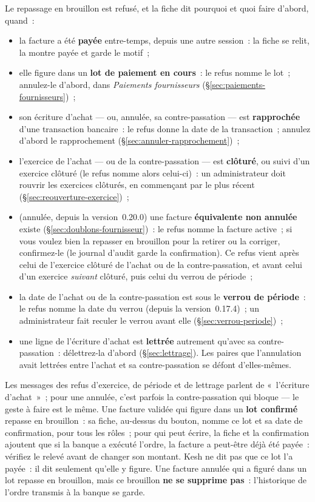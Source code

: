 \documentclass[a4paper,11pt,oneside]{article}
\begin{document}
Le repassage en brouillon est refusé, et la fiche dit pourquoi et quoi faire d'abord, quand~:
\begin{itemize}
    \item la facture a été \textbf{payée} entre-temps, depuis une autre session~: la fiche se
          relit, la montre payée et garde le motif~;
    \item elle figure dans un \textbf{lot de paiement en cours}~: le refus nomme le lot~;
          annulez-le d'abord, dans \emph{Paiements fournisseurs}
          (\S\ref{sec:paiements-fournisseurs})~;
    \item son écriture d'achat --- ou, annulée, sa contre-passation --- est \textbf{rapprochée}
          d'une transaction bancaire~: le refus donne la date de la transaction~; annulez
          d'abord le rapprochement (\S\ref{sec:annuler-rapprochement})~;
    \item l'exercice de l'achat --- ou de la contre-passation --- est \textbf{clôturé}, ou suivi
          d'un exercice clôturé (le refus nomme alors celui-ci)~: un administrateur doit rouvrir
          les exercices clôturés, en commençant par le plus récent
          (\S\ref{sec:reouverture-exercice})~;
    \item (annulée, depuis la version~0.20.0) une facture \textbf{équivalente non annulée}
          existe (\S\ref{sec:doublons-fournisseur})~: le refus nomme la facture active~; si
          vous voulez bien la repasser en brouillon pour la retirer ou la corriger, confirmez-le
          (le journal d'audit garde la confirmation). Ce refus vient après celui de l'exercice
          clôturé de l'achat ou de la contre-passation, et avant celui d'un exercice \emph{suivant}
          clôturé, puis celui du verrou de période~;
    \item la date de l'achat ou de la contre-passation est sous le \textbf{verrou de période}~:
          le refus nomme la date du verrou (depuis la version~0.17.4)~; un administrateur fait
          reculer le verrou avant elle (\S\ref{sec:verrou-periode})~;
    \item une ligne de l'écriture d'achat est \textbf{lettrée} autrement qu'avec sa
          contre-passation~: délettrez-la d'abord (\S\ref{sec:lettrage}). Les paires que
          l'annulation avait lettrées entre l'achat et sa contre-passation se défont d'elles-mêmes.
\end{itemize}
Les messages des refus d'exercice, de période et de lettrage parlent de «~l'écriture
d'achat~»~; pour une annulée, c'est parfois la contre-passation qui bloque --- le geste à faire
est le même. Une facture validée qui figure dans un \textbf{lot confirmé} repasse en brouillon~:
sa fiche, au-dessus du bouton, nomme ce lot et sa date de confirmation, pour tous les rôles~;
pour qui peut écrire, la fiche et la confirmation ajoutent que si la banque a exécuté l'ordre,
la facture a peut-être déjà été payée~: vérifiez le relevé avant de changer son montant. Kesh
ne dit pas que ce lot l'a payée~: il dit seulement qu'elle y figure. Une facture annulée qui a
figuré dans un lot repasse en brouillon, mais ce brouillon \textbf{ne se supprime pas}~:
l'historique de l'ordre transmis à la banque se garde.
\end{document}
